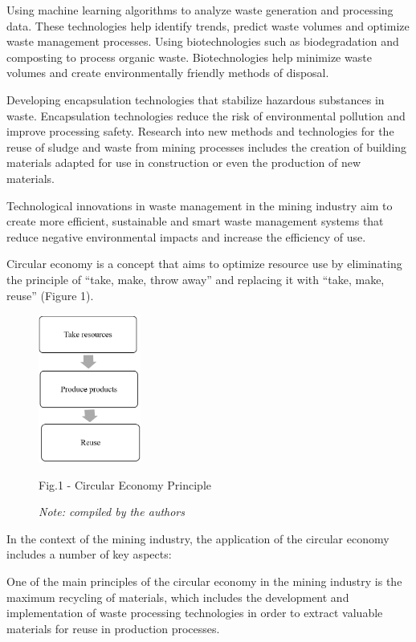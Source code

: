 \begin{multicols}{2}
Using machine learning algorithms to analyze waste generation and
processing data. These technologies help identify trends, predict waste
volumes and optimize waste management processes. Using biotechnologies
such as biodegradation and composting to process organic waste.
Biotechnologies help minimize waste volumes and create environmentally
friendly methods of disposal.

Developing encapsulation technologies that stabilize hazardous
substances in waste. Encapsulation technologies reduce the risk of
environmental pollution and improve processing safety. Research into new
methods and technologies for the reuse of sludge and waste from mining
processes includes the creation of building materials adapted for use in
construction or even the production of new materials.

Technological innovations in waste management in the mining industry aim
to create more efficient, sustainable and smart waste management systems
that reduce negative environmental impacts and increase the efficiency
of use.

Circular economy is a concept that aims to optimize resource use by
eliminating the principle of ``take, make, throw away'' and replacing it
with ``take, make, reuse'' (Figure 1).

\begin{figure}[H]
	\centering
	\includegraphics[width=0.3\textwidth]{media/gorn4/image4}
	\caption*{Fig.1 - Circular Economy Principle}
	\caption*{\normalfont\emph{Note: compiled by the authors}}
\end{figure}

In the context of the mining industry, the application of the circular
economy includes a number of key aspects:

One of the main principles of the circular economy in the mining
industry is the maximum recycling of materials, which includes the
development and implementation of waste processing technologies in order
to extract valuable materials for reuse in production processes.


\end{multicols}

